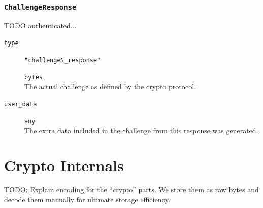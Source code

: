 \documentclass[pdftex,12pt,a4papaer,twoside,notitlepage]{report}
\begin{document}
\begin{appendices}
\subsubsection{\texttt{ChallengeResponse}}
\label{struct:challenge_response}

TODO authenticated...

\begin{leftbar}
\begin{description}
\item[\texttt{type}] \verb="challenge\_response"=
\item[\texttt{}] \texttt{bytes} \\ 
  The actual challenge as defined by the crypto protocol.
\item[\texttt{user\_data}] \texttt{any} \\
  The extra data included in the challenge from this response was generated.
\end{description}
\end{leftbar}

\section{Crypto Internals}
\label{sec:crypto-spec}

TODO: Explain encoding for the ``crypto'' parts. We store them as raw bytes and
decode them manually for ultimate storage efficiency.

\end{appendices}



\end{document}
